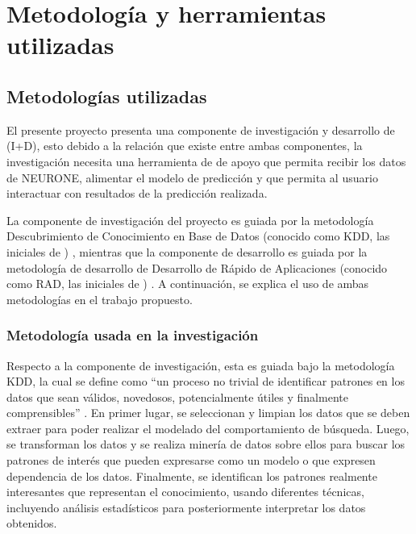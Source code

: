 \section{Metodología y herramientas utilizadas}
\label{sec:metodologia-herramientas}


\subsection{Metodologías utilizadas}
\label{subsec:metodologia}

El presente proyecto presenta una componente de investigación y desarrollo de  (I+D), esto debido a la relación que existe entre ambas componentes, la investigación necesita una herramienta de  de apoyo que permita recibir los datos de NEURONE, alimentar el modelo de predicción y que permita al usuario interactuar con resultados de la predicción realizada.

La componente de investigación del proyecto es guiada por la metodología Descubrimiento de Conocimiento en Base de Datos (conocido como KDD, las iniciales de ) \parencite{fayyad1996data}, mientras que la componente de desarrollo es guiada por la metodología de desarrollo de  Desarrollo de Rápido de Aplicaciones (conocido como RAD, las iniciales de ) \parencite{martin1991rapid}. A continuación, se explica el uso de ambas metodologías en el trabajo propuesto.

\subsubsection*{Metodología usada en la investigación}
Respecto a la componente de investigación, esta es guiada bajo la metodología KDD, la cual se define como “un proceso no trivial de identificar patrones en los datos que sean válidos, novedosos, potencialmente útiles y finalmente comprensibles” \parencite[p.~5]{fayyad1996data}. En primer lugar, se seleccionan y limpian los datos que se deben extraer para poder realizar el modelado del comportamiento de búsqueda. Luego, se transforman los datos y se realiza minería de datos sobre ellos para buscar los patrones de interés que pueden expresarse como un modelo o que expresen dependencia de los datos. Finalmente, se identifican los patrones realmente interesantes que representan el conocimiento, usando diferentes técnicas, incluyendo análisis estadísticos para posteriormente interpretar los datos obtenidos.


